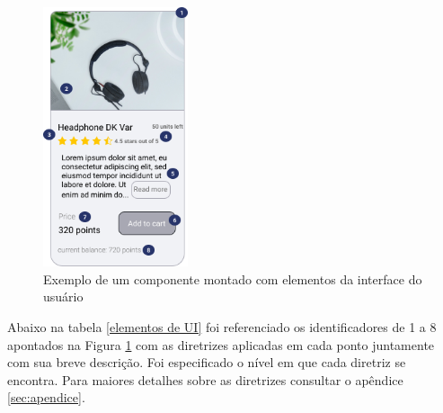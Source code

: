 {\begin{figure}[ht]
        \centering
    	\includegraphics[width=0.38\textwidth]{images/ui-exemplo.png}
        \caption{Exemplo de um componente montado com elementos da interface do usuário}
        \label{fig:UI_componentes}
\end{figure}

Abaixo na tabela \ref{elementos de UI} foi referenciado os identificadores de 1 a 8 apontados na Figura \ref{fig:UI_componentes} com as diretrizes aplicadas em cada ponto juntamente com sua breve descrição. Foi especificado o nível em que cada diretriz se encontra. Para maiores detalhes sobre as diretrizes consultar o apêndice \ref{sec:apendice}.
{


}}

